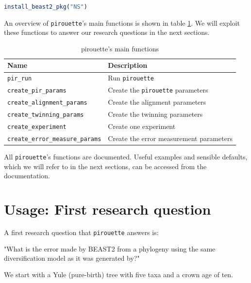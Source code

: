 \documentclass{article}
\begin{document}
\begin{lstlisting}[language=R, floatplacement=H, frame=single]
install_beast2_pkg("NS")
\end{lstlisting}

An overview of \verb;pirouette;'s main functions is shown in 
table \ref{tab:functions}. We will exploit these functions to answer our research questions in the next sections.

\begin{table}[h]
\centering
\begin{tabular}{ | l | l | }
\hline
\textbf{Name} & \textbf{Description} \\
\hline
\verb;pir_run; & Run \verb;pirouette; \\
\verb;create_pir_params; & Create the \verb;pirouette; parameters \\
\hline
\verb;create_alignment_params; & Create the alignment parameters \\
\verb;create_twinning_params; & Create the twinning parameters \\
\verb;create_experiment; & Create one experiment \\
\verb;create_error_measure_params; & Create the error measurement parameters \\
\hline
\end{tabular}
\caption{pirouette's main functions}
\label{tab:functions}
\end{table}

All \verb;pirouette;'s functions are documented. Useful examples and sensible defaults, which we will refer to in the next sections, can be accessed from the documentation.

\section{Usage: First research question}

A first research question that \verb;pirouette; answers is:

"What is the error made by BEAST2 from a phylogeny using the same diversification model as it was generated by?"

We start with a Yule (pure-birth) tree with five taxa and a crown age of ten.
\end{document}

